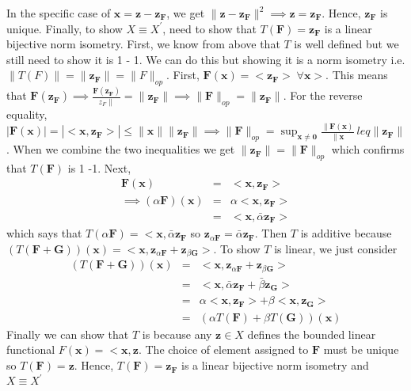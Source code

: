 \documentclass[11pt]{SelfArxOneColBMN}
\begin{document}
\begin{solution}
  In the specific case of $\mathbf{x} = \mathbf{z} - \mathbf{z_F}$, we get $\|\mathbf{z} - \mathbf{z_F}\|^2 \implies \mathbf{z} = \mathbf{z_F}$. Hence, $\mathbf{z_F}$ is unique. Finally, to show $X \equiv X^\prime$, need to show that $T(\mathbf{F}) = \mathbf{z_F}$ is a linear bijective norm isometry. First, we know from above that $T$ is well defined but we still need to show it is 1 - 1. We can do this but showing it is a norm isometry i.e. $\|T(F)\| = \|\mathbf{z_F}\| = \|F\|_{op}$. First, $\mathbf{F}(\mathbf{x}) = <\mathbf{z_F}> \; \forall \mathbf{x}>$. This means that $\mathbf{F}(\mathbf{z_F}) \implies \frac{\mathbf{F}(\mathbf{z_F})}{{z_F}\|} = \|\mathbf{z_F}\| \implies \|\mathbf{F}\|_{op} = \|\mathbf{z_F}\|$. For the reverse equality, $|\mathbf{F}(\mathbf{x})| = |<\mathbf{x},\mathbf{z_F}>| \leq \|\mathbf{x}\|\|\mathbf{z_F}\| \implies \|\mathbf{F}\|_{op} = \sup_{\mathbf{x \neq 0}}\frac{\|\mathbf{F(x)}}{\|\mathbf{x}} \ leq \|\mathbf{z_F}\|$. When we combine the two inequalities we get $\|\mathbf{z_F}\|= \|\mathbf{F}\|_{op}$ which confirms that $T(\mathbf{F})$ is 1 -1. Next,
  \begin{eqnarray*}
    \mathbf{F(x)} &=& <\mathbf{x,z_F}>\\
    \implies (\alpha \mathbf{F})(\mathbf{x}) &=& \alpha<\mathbf{x,z_F}>\\
    &=& <\mathbf{x},\bar{\alpha}\mathbf{z_F}>
  \end{eqnarray*}
  which says that $T(\alpha\mathbf{F}) = <\mathbf{x},\bar{\alpha}\mathbf{z_F}$ so $\mathbf{z}_{\alpha\mathbf{F}} = \bar{\alpha}\mathbf{z_F}$. Then $T$ is additive because $(T(\mathbf{F} + \mathbf{G}))(\mathbf{x}) = <\mathbf{x},\mathbf{z}_{\alpha\mathbf{F}} + \mathbf{z}_{\beta\mathbf{G}}>$. To show $T$ is linear, we just consider 
  \begin{eqnarray*}
    (T(\mathbf{F} + \mathbf{G}))(\mathbf{x}) &=& <\mathbf{x},\mathbf{z}_{\alpha\mathbf{F}} + \mathbf{z}_{\beta\mathbf{G}}>\\
    &=& <\mathbf{x},\bar{\alpha}\mathbf{z_F} + \bar{\beta}\mathbf{z_G}>\\
    &=& \alpha<\mathbf{x},\mathbf{z_F}> + \beta<\mathbf{x},\mathbf{z_G}>\\
    &=& (\alpha T(\mathbf{F}) + \beta T(\mathbf{G}))(\mathbf{x})
  \end{eqnarray*}
  Finally we can show that $T$ is because any $\mathbf{z} \in X$ defines the bounded linear functional $F(\mathbf{x}) = <\mathbf{x},\mathbf{z}$. The choice of element assigned to $\mathbf{F}$ must be unique so $T(\mathbf{F}) = \mathbf{z}$. Hence, $T(\mathbf{F}) = \mathbf{z_F}$ is a linear bijective norm isometry and $X \equiv X^\prime$
\end{solution}
\end{document}
